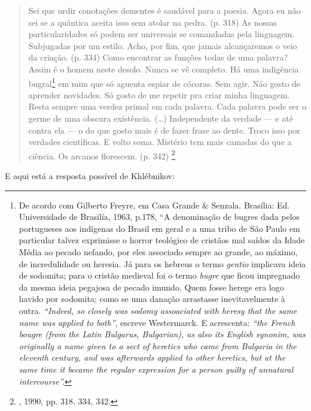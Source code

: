 \begin{quote}
Sei que urdir conotações dementes é saudável para a poesia. Agora eu não
sei se a quântica aceita isso sem atolar na pedra. (p. 318) As nossas
particularidades só podem ser universais se comandadas pela linguagem.
Subjugadas por um estilo. Acho, por fim, que jamais alcançaremos o veio
da criação. (p. 334) Como encontrar as funções todas de uma palavra?
Assim é o homem neste desolo. Nunca se vê completo. Há uma indigência
bugral\footnote{De acordo com Gilberto Freyre, em Casa Grande \&
  Senzala. Brasília: Ed. Universidade de Brasilía, 1963, p.178, ``A
  denominação de bugres dada pelos portugueses aos indígenas do Brasil
 em geral e a uma tribo de São Paulo em particular talvez exprimisse o
  horror teológico de cristãos mal saídos da Idade Média ao pecado
  nefando, por eles associado sempre ao grande, ao máximo, de
  incredulidade ou heresia. Já para os hebreus o termo \emph{gentio}
  implicava ideia de sodomita; para o cristão medieval foi o termo
  \emph{bugre} que ficou impregnado da mesma ideia pegajosa de pecado
  imundo. Quem fosse herege era logo havido por sodomita; como se uma
  danação arrastasse inevitavelmente à outra. \emph{``Indeed, so closely
  was sodomy assoaciated with heresy that the same name was
  applied to both''}, escreve Westermarck. E acrescenta: \emph{``the
  French \emph{bougre} (from the Latin \emph{Bulgarus}, \emph{Bulgarian}), as also its English
  synonim, was originally a name given to a sect of heretics who came from
  Bulgaria in the eleventh century, and was afterwards applied to other
  heretics, but at the same time it became the regular expression for
  a person guilty of unnatural intercourse''.}} em mim que só aguenta
espiar de cócoras. Sem agir. Não gosto de aprender novidades. Só gosto
de me repetir pra criar minha linguagem. Resta sempre uma verdez primal
em cada palavra. Cada palavra pode ser o germe de uma obscura
existência. (\ldots{}) Independente da verdade --- e até contra ela --- o do
que gosto mais é de fazer frase ao dente. Troco isso por verdades
científicas. E volto soma. Mistério tem mais camadas do que a ciência.
Os arcanos florescem. (p. 342) \footnote{, 1990, pp. 318, 334,
  342.}
\end{quote}

E aqui está a resposta possível de Khlébnikov:

